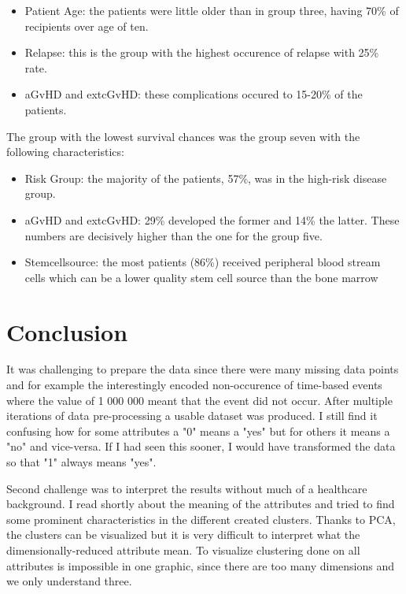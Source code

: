 \documentclass[a4paper,12pt]{article}
\begin{document}
\begin{itemize}
  \item Patient Age: the patients were little older than in group three, having 70\% of recipients over age of ten.
  \item Relapse: this is the group with the highest occurence of relapse with 25\% rate.
  \item aGvHD and extcGvHD: these complications occured to 15-20\% of the patients.
\end{itemize}

\noindent
The group with the lowest survival chances was the group seven with the following characteristics:

\begin{itemize}
  \item Risk Group: the majority of the patients, 57\%, was in the high-risk disease group.
  \item aGvHD and extcGvHD: 29\% developed the former and 14\% the latter. These numbers are decisively higher than the one for the group five.
  \item Stemcellsource: the most patients (86\%) received peripheral blood stream cells which can be a lower quality stem cell source than the bone marrow
\end{itemize}

\section{Conclusion}

It was challenging to prepare the data since there were many missing data points and for example the interestingly encoded non-occurence of time-based events where the value of 1 000 000 meant that the event did not occur. After multiple iterations of data pre-processing a usable dataset was produced. I still find it confusing how for some attributes a "0" means a "yes" but for others it means a "no" and vice-versa. If I had seen this sooner, I would have transformed the data so that "1" always means "yes".

Second challenge was to interpret the results without much of a healthcare background. I read shortly about the meaning of the attributes and tried to find some prominent characteristics in the different created clusters. Thanks to PCA, the clusters can be visualized but it is very difficult to interpret what the dimensionally-reduced attribute mean. To visualize clustering done on all attributes is impossible in one graphic, since there are too many dimensions and we only understand three.
\end{document}
